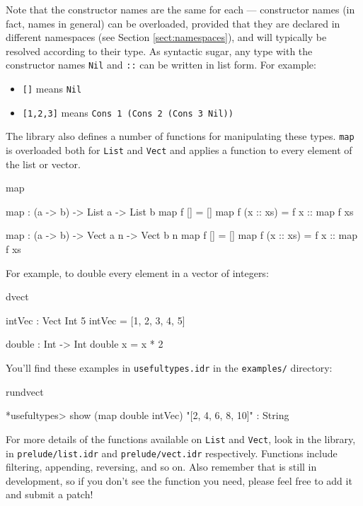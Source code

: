\noindent
Note that the constructor names are the same for each --- constructor names (in
fact, names in general) can be overloaded, provided that they are declared in
different namespaces (see Section \ref{sect:namespaces}), and will typically be
resolved according to their type. As syntactic sugar, any type with the constructor
names \texttt{Nil} and \texttt{::} can be written in list form. For example:

\begin{itemize}
\item \texttt{[]} means \texttt{Nil}
\item \texttt{[1,2,3]} means \texttt{Cons 1 (Cons 2 (Cons 3 Nil))}
\end{itemize}

\noindent
The library also defines a number of functions for manipulating these types.
\texttt{map} is overloaded both for \texttt{List} and \texttt{Vect}
and applies a function to every element of the list or vector.

\begin{SaveVerbatim}{map}

map : (a -> b) -> List a -> List b
map f []        = []
map f (x :: xs) = f x :: map f xs

map : (a -> b) -> Vect a n -> Vect b n
map f []        = []
map f (x :: xs) = f x :: map f xs

\end{SaveVerbatim}

\noindent
For example, to double every element in a vector of integers:

\begin{SaveVerbatim}{dvect}

intVec : Vect Int 5
intVec = [1, 2, 3, 4, 5]

double : Int -> Int
double x = x * 2

\end{SaveVerbatim}

\noindent
You'll find these examples in \texttt{usefultypes.idr} in the \texttt{examples/} directory:

\begin{SaveVerbatim}{rundvect}

*usefultypes> show (map double intVec) 
"[2, 4, 6, 8, 10]" : String

\end{SaveVerbatim}

\noindent
For more details of the functions available on \texttt{List} and \texttt{Vect},
look in the library, in \texttt{prelude/list.idr} and \texttt{prelude/vect.idr} respectively.
Functions include filtering, appending, reversing, and so on. Also remember
that \Idris{} is still in development, so if you don't see the function you
need, please feel free to add it and submit a patch!

